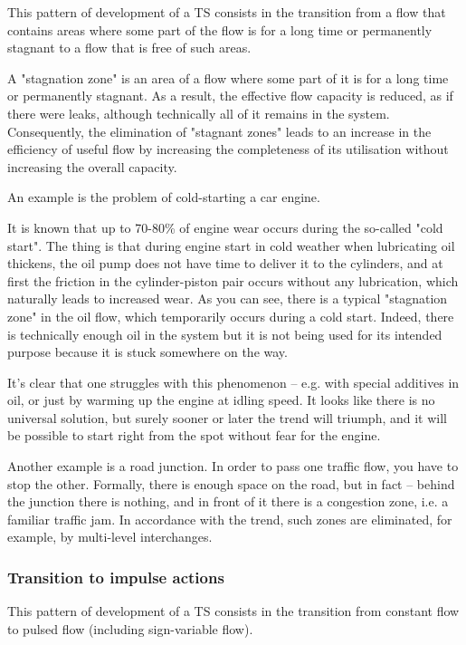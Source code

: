 \documentclass[a4paper,11pt]{article}
\begin{document}
This pattern of development of a TS consists in the transition from a flow
that contains areas where some part of the flow is for a long time or
permanently stagnant to a flow that is free of such areas.

A "stagnation zone" is an area of a flow where some part of it is for a long
time or permanently stagnant. As a result, the effective flow capacity is
reduced, as if there were leaks, although technically all of it remains in the
system. Consequently, the elimination of "stagnant zones" leads to an increase
in the efficiency of useful flow by increasing the completeness of its
utilisation without increasing the overall capacity.

An example is the problem of cold-starting a car engine.

It is known that up to 70-80\% of engine wear occurs during the so-called
"cold start". The thing is that during engine start in cold weather when
lubricating oil thickens, the oil pump does not have time to deliver it to the
cylinders, and at first the friction in the cylinder-piston pair occurs
without any lubrication, which naturally leads to increased wear. As you can
see, there is a typical "stagnation zone" in the oil flow, which temporarily
occurs during a cold start. Indeed, there is technically enough oil in the
system but it is not being used for its intended purpose because it is stuck
somewhere on the way.

It's clear that one struggles with this phenomenon -- e.g. with special
additives in oil, or just by warming up the engine at idling speed. It looks
like there is no universal solution, but surely sooner or later the trend will
triumph, and it will be possible to start right from the spot without fear for
the engine.

Another example is a road junction. In order to pass one traffic flow, you
have to stop the other. Formally, there is enough space on the road, but in
fact -- behind the junction there is nothing, and in front of it there is a
congestion zone, i.e. a familiar traffic jam. In accordance with the trend,
such zones are eliminated, for example, by multi-level interchanges.

\subsubsection{Transition to impulse actions}

This pattern of development of a TS consists in the transition from constant
flow to pulsed flow (including sign-variable flow).
\end{document}
